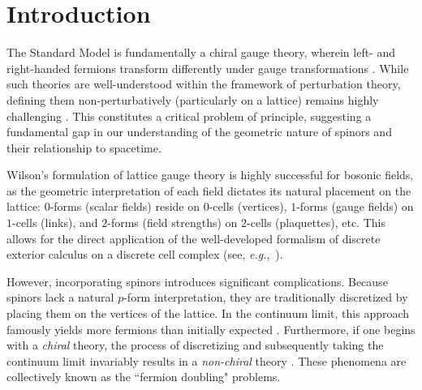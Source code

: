 \section{Introduction}\label{sec:KD_intro}

The Standard Model is fundamentally a chiral gauge theory, wherein left- and right-handed fermions transform differently under gauge transformations \cite{Cheng:1984vwu, Peskin:1995ev, Schwartz:2014sze}. While such theories are well-understood within the framework of perturbation theory, defining them non-perturbatively (particularly on a lattice) remains highly challenging \cite{Montvay:1994cy, Smit_2002,Gattringer:2010zz}. This constitutes a critical problem of principle, suggesting a fundamental gap in our understanding of the geometric nature of spinors and their relationship to spacetime.  

Wilson's formulation of lattice gauge theory \cite{Wilson:1974sk} is highly successful for bosonic fields, as the geometric interpretation of each field dictates its natural placement on the lattice: $0$-forms (scalar fields) reside on $0$-cells (vertices), $1$-forms (gauge fields) on $1$-cells (links), and $2$-forms (field strengths) on $2$-cells (plaquettes), etc. This allows for the direct application of the well-developed formalism of discrete exterior calculus on a discrete cell complex (see, {\it e.g.},\ \cite{desbrun2005discrete, desbrun2006discrete}).  

However, incorporating spinors introduces significant complications. Because spinors lack a natural $p$-form interpretation, they are traditionally discretized by placing them on the vertices of the lattice. In the continuum limit, this approach famously yields more fermions than initially expected \cite{Montvay:1994cy,Smit_2002}. Furthermore, if one begins with a {\it chiral} theory, the process of discretizing and subsequently taking the continuum limit invariably results in a {\it non-chiral} theory \cite{Nielsen:1981hk, Nielsen:1980rz, Nielsen:1981xu}. These phenomena are collectively known as the ``fermion doubling" problems.

